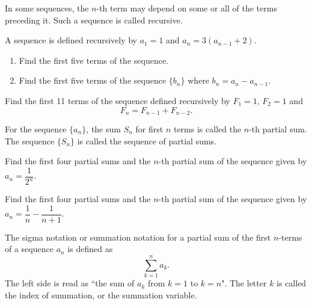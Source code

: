 In some sequences, the $n$-th term may depend on some or all of the terms preceding
it. Such a sequence is called recursive.

\begin{example}
   A sequence is defined recursively by $a_1=1$ and $a_n=3(a_{n-1}+2)$.
   \begin{enumerate}
       \item Find the first five terms of the sequence.
       \item Find the first five terms of the sequence $\{b_n\}$ where $b_n=a_n-a_{n-1}$.
   \end{enumerate}
\end{example}

\begin{example}
    Find the first 11 terms of the sequence defined recursively by $F_1=1$, $F_2=1$ and 
    $$F_n=F_{n-1} + F_{n-2}.$$
\end{example}
\vspace*{8\baselineskip}

\begin{definition}
For the sequence $\{a_n\}$, the sum $S_n$ for first $n$ terms is called the $n$-th partial sum. The sequence $\{S_n\}$ is called the sequence of partial sums.
\end{definition}

\begin{example}
    Find the first four partial sums and the $n$-th partial sum of the sequence given by $a_n=\dfrac{1}{2^n}$.
\end{example}
\vspace*{8\baselineskip}

\begin{example}
    Find the first four partial sums and the $n$-th partial sum of the sequence given by $a_n=\dfrac{1}{n}-\dfrac{1}{n+1}$.
\end{example}
\vspace*{8\baselineskip}

\begin{definition}
    The sigma notation or summation notation for a partial sum of the first $n$-terms of a sequence $a_n$ is defined as
    \[\sum_{k=1}^na_k.\]
    The left side is read as ``the sum of $a_k$ from $k=1$ to $k=n$".  The letter
$k$ is called the index of summation, or the summation variable.
\end{definition}

